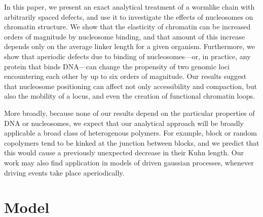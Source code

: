 \documentclass[%
 reprint,
superscriptaddress,
showpacs,preprintnumbers,
 amsmath,amssymb,
 aps,
 prl,
]{revtex4-1}
\begin{document}
In this paper, we present an exact analytical treatment of a wormlike chain
    with arbitrarily spaced defects, and use it to investigate the effects of
    nucleosomes on chromatin structure.
We show that the elasticity of chromatin can be increased orders of magnitude by
    nucleosome binding, and that amount of this increase depends only on the average
    linker length for a given organism.
Furthermore, we show that aperiodic defects due to binding of nucleosomes---or, in
    practice, any protein that binds DNA---can change the
    propensity of two genomic loci encountering each other by up to six
    orders of magnitude.
Our results suggest that nucleosome positioning can affect not only
    accessibility and compaction, but also the mobility of a locus, and even
    the creation of functional chromatin loops.


More broadly, because none of our results depend on the particular properties of DNA or
    nucleosomes, we expect that our analytical approach will be broadly
    applicable a broad class of heterogenous polymers.
For example, block or random copolymers tend to be kinked at the junction
    between blocks, and we predict that this would cause a previously unexpected
    decrease in their Kuhn length.
Our work may also find application in models of driven gaussian processes,
    whenever driving events take place aperiodically.

\section{\label{sec:model}Model}
\end{document}
